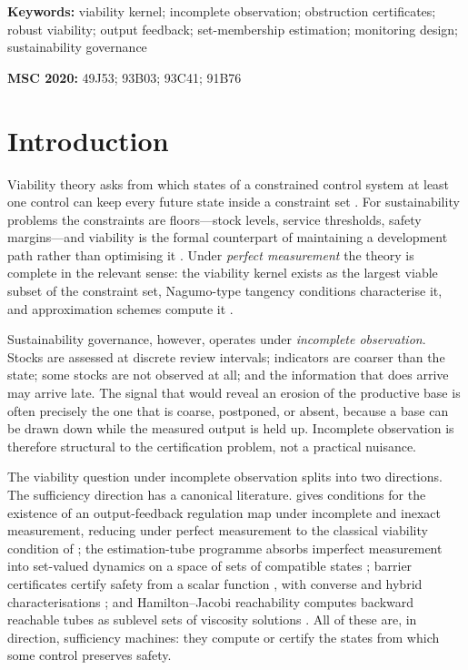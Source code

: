 \documentclass[11pt,a4paper]{article}
\theoremstyle{plain}
\theoremstyle{definition}
\theoremstyle{remark}
\begin{document}
\noindent\textbf{Keywords:} viability kernel; incomplete observation; obstruction certificates; robust viability; output feedback; set-membership estimation; monitoring design; sustainability governance

\smallskip\noindent\textbf{MSC 2020:} 49J53; 93B03; 93C41; 91B76

\section{Introduction}\label{sec:intro}

Viability theory asks from which states of a constrained control system at least one control can keep every future state inside a constraint set \citep{aubin1991}. For sustainability problems the constraints are floors---stock levels, service thresholds, safety margins---and viability is the formal counterpart of maintaining a development path rather than optimising it \citep{bene2001,delara2008,doyen2012,doyen2020}. Under \emph{perfect measurement} the theory is complete in the relevant sense: the viability kernel exists as the largest viable subset of the constraint set, Nagumo-type tangency conditions characterise it, and approximation schemes compute it \citep{saintpierre1994,aubin2011}.

Sustainability governance, however, operates under \emph{incomplete observation}. Stocks are assessed at discrete review intervals; indicators are coarser than the state; some stocks are not observed at all; and the information that does arrive may arrive late. The signal that would reveal an erosion of the productive base is often precisely the one that is coarse, postponed, or absent, because a base can be drawn down while the measured output is held up. Incomplete observation is therefore structural to the certification problem, not a practical nuisance.

The viability question under incomplete observation splits into two directions. The sufficiency direction has a canonical literature. \citet{veliov1993} gives conditions for the existence of an output-feedback regulation map under incomplete and inexact measurement, reducing under perfect measurement to the classical viability condition of \citet{haddad1981}; the estimation-tube programme absorbs imperfect measurement into set-valued dynamics on a space of sets of compatible states \citep{kurzhanski1997,cardaliaguet2007}; barrier certificates certify safety from a scalar function \citep{prajna2004,prajna2007}, with converse and hybrid characterisations \citep{prajna2005,maghenem2019}; and Hamilton--Jacobi reachability computes backward reachable tubes as sublevel sets of viscosity solutions \citep{mitchell2005,margellos2011,bansal2017}. All of these are, in direction, sufficiency machines: they compute or certify the states from which some control preserves safety.
\end{document}
